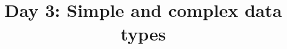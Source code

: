 \documentclass{article}
\begin{document}
\title{Day 3: Simple and complex data types}
\date{}
\maketitle


\end{document}
